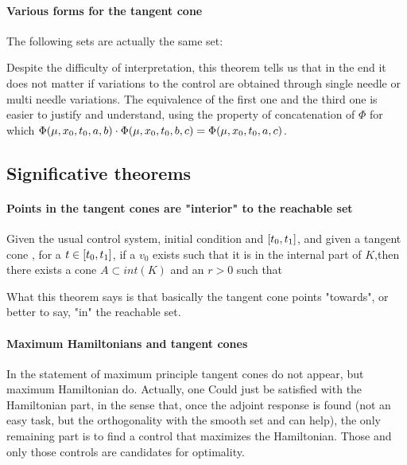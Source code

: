 \paragraph[lemma 5.5]{Various forms for the tangent cone}
\begin{teo}
	The following sets are actually the same set: 
\label{5-5}
\end{teo}
Despite the difficulty of interpretation, this theorem tells us that in the end it does not matter if variations to the control are obtained through single needle or multi needle variations. The equivalence of the first one and the third one is easier to justify and understand, using the property of concatenation of $\Phi$ for which $\Phi(\mu,x_0,t_0,a,b)\cdot\Phi(\mu,x_0,t_0,b,c)=\Phi(\mu,x_0,t_0,a,c)$.


\subsection{Significative theorems}
\paragraph[5.10]{Points in the tangent cones are "interior" to the reachable set}
\begin{teo}
	Given the usual control system, initial condition and $[t_0,t_1]$, and given a tangent cone , for a $t\in[t_0,t_1]$, if a $v_0$ exists such that it is in the internal part of $K$,then there exists a cone $A\subset int(K)$ and an $r>0$ such that 
\label{5-10}
\end{teo}

What this theorem says is that basically the tangent cone points "towards", or better to say, "in" the reachable set. 

\paragraph[5.12-5.14]{Maximum Hamiltonians and tangent cones}
In the statement of maximum principle tangent cones do not appear, but maximum Hamiltonian do. Actually, one Could just be satisfied with the Hamiltonian part, in the sense that, once the adjoint response is found (not an easy task, but the orthogonality with the smooth set \so\space and \sz\space can help), the only remaining part is to find a control that maximizes the Hamiltonian. Those and only those controls are candidates for optimality. 

